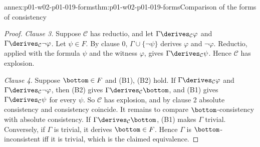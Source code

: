 \begin{annexitem}{annex:p01-w02-p01-019-forms}{thm:p01-w02-p01-019-forms}{Comparison of the forms of consistency}
\begin{proof}
\emph{Clause 3.} Suppose \(\mathcal C\) has reductio, and let
\(\Gamma\derives_{\mathcal C}\varphi\) and
\(\Gamma\derives_{\mathcal C}\neg\varphi\). Let \(\psi\in F\). By clause 0,
\(\Gamma\cup\{\neg\psi\}\) derives \(\varphi\) and \(\neg\varphi\). Reductio,
applied with the formula \(\psi\) and the witness \(\varphi\), gives
\(\Gamma\derives_{\mathcal C}\psi\). Hence \(\mathcal C\) has explosion.

\emph{Clause 4.} Suppose \(\bottom\in F\) and (B1), (B2) hold. If
\(\Gamma\derives_{\mathcal C}\varphi\) and
\(\Gamma\derives_{\mathcal C}\neg\varphi\), then (B2) gives
\(\Gamma\derives_{\mathcal C}\bottom\), and (B1) gives
\(\Gamma\derives_{\mathcal C}\psi\) for every \(\psi\). So \(\mathcal C\) has
explosion, and by clause 2 absolute consistency and consistency coincide. It
remains to compare \(\bottom\)-consistency with absolute consistency. If
\(\Gamma\derives_{\mathcal C}\bottom\), (B1) makes \(\Gamma\) trivial.
Conversely, if \(\Gamma\) is trivial, it derives \(\bottom\in F\). Hence
\(\Gamma\) is \(\bottom\)-inconsistent iff it is trivial, which is the
claimed equivalence.
\end{proof}
\end{annexitem}

